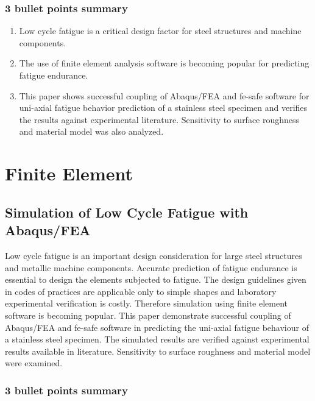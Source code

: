 \documentclass[
  letterpaper,
  DIV=11,
  numbers=noendperiod]{scrreprt}
\providecommand{\tightlist}{%
  \setlength{\itemsep}{0pt}\setlength{\parskip}{0pt}}\usepackage{longtable,booktabs,array}
\begin{document}
\hypertarget{bullet-points-summary-3}{%
\subsubsection{3 bullet points summary}\label{bullet-points-summary-3}}

\begin{enumerate}
\def\labelenumi{\arabic{enumi}.}
\tightlist
\item
  Low cycle fatigue is a critical design factor for steel structures and
  machine components.
\item
  The use of finite element analysis software is becoming popular for
  predicting fatigue endurance.
\item
  This paper shows successful coupling of Abaqus/FEA and fe-safe
  software for uni-axial fatigue behavior prediction of a stainless
  steel specimen and verifies the results against experimental
  literature. Sensitivity to surface roughness and material model was
  also analyzed.
\end{enumerate}

\hypertarget{finite-element}{%
\section{Finite Element}\label{finite-element}}

\hypertarget{simulation-of-low-cycle-fatigue-with-abaqusfea}{%
\subsection{Simulation of Low Cycle Fatigue with
Abaqus/FEA}\label{simulation-of-low-cycle-fatigue-with-abaqusfea}}

Low cycle fatigue is an important design consideration for large steel
structures and metallic machine components. Accurate prediction of
fatigue endurance is essential to design the elements subjected to
fatigue. The design guidelines given in codes of practices are
applicable only to simple shapes and laboratory experimental
verification is costly. Therefore simulation using finite element
software is becoming popular. This paper demonstrate successful coupling
of Abaqus/FEA and fe-safe software in predicting the uni-axial fatigue
behaviour of a stainless steel specimen. The simulated results are
verified against experimental results available in literature.
Sensitivity to surface roughness and material model were examined.

\hypertarget{bullet-points-summary-4}{%
\subsubsection{3 bullet points summary}\label{bullet-points-summary-4}}
\end{document}
